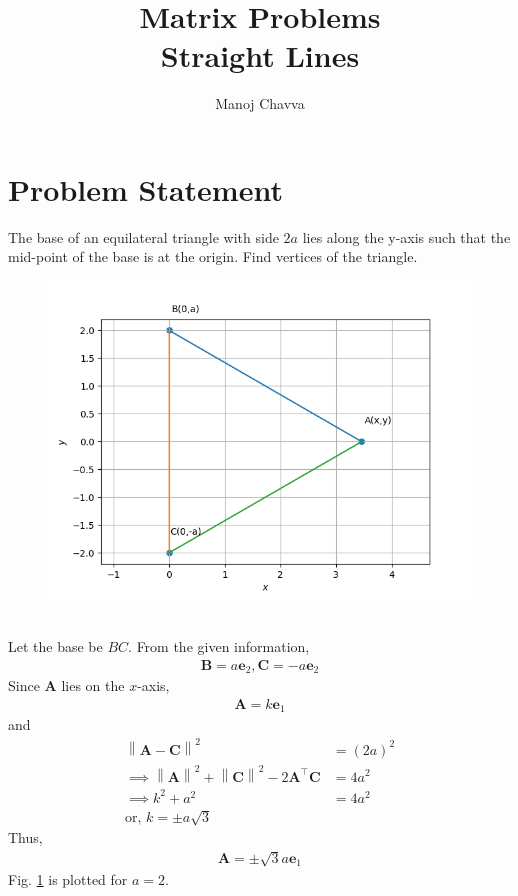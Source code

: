 \documentclass[journal,12pt,twocolumn]{IEEEtran}
\title{Matrix Problems \textbf{\\Straight Lines }}
\author{Manoj Chavva}
\providecommand{\norm}[1]{\left\lVert#1\right\rVert}
\let\vec\mathbf
\providecommand{\brak}[1]{\ensuremath{\left(#1\right)}}
\begin{document}
\maketitle



\section{Problem Statement}

\noindent 
\fi
The base of an equilateral triangle with side $2a$ lies along the y-axis such that the mid-point of the base is at the origin. Find vertices of the triangle.
	\begin{figure}[!ht]
		\centering
 \includegraphics[width=\columnwidth]{chapters/11/10/1/2/figs/triangle.png}
		\caption{}
		\label{fig:11/10/1/2}
  	\end{figure}
	\\
	\solution Let the base be $BC$.  From the given information, 
\begin{align}
	\vec{B} = a\vec{e}_2,
	\vec{C} = -a\vec{e}_2
\end{align}
Since $\vec{A}$ lies on the $x$-axis, 
\begin{align}
	\vec{A} = k\vec{e}_1
\end{align}
and 
\begin{align}
	\norm{\vec{A}-\vec{C}}^2 &= \brak{2a}^2
	\\
	\implies \norm{\vec{A}}^2+\norm{\vec{C}}^2 - 2 \vec{A}^{\top}\vec{C} &= 4a^2
	\\
	\implies k^2 +a^2 &= 4a^2
	\\
	\text{or, } k = \pm a\sqrt{3}
\end{align}
Thus, 
\begin{align}
	\vec{A} = \pm \sqrt{3}a\vec{e}_1
\end{align}
		Fig. \ref{fig:11/10/1/2}
		is plotted for $a = 2$.
\end{document}
